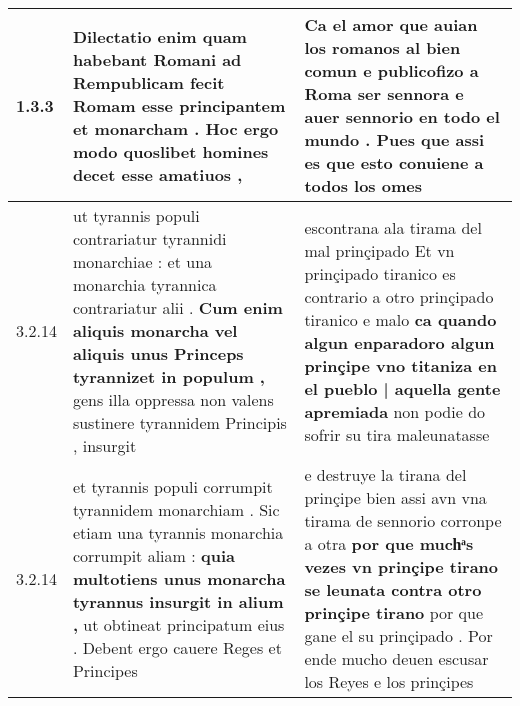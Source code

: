 \begin{tabular}{|p{1cm}|p{6.5cm}|p{6.5cm}|}

\hline
1.3.3 & Dilectatio enim quam habebant Romani ad Rempublicam fecit Romam esse principantem \textbf{ et monarcham . } Hoc ergo modo quoslibet homines decet esse amatiuos , & Ca el amor que auian los romanos al bien comun e publicofizo a Roma ser sennora \textbf{ e auer sennorio en todo el mundo . } Pues que assi es que esto conuiene a todos los omes \\\hline
3.2.14 & ut tyrannis populi contrariatur tyrannidi monarchiae : et una monarchia tyrannica contrariatur alii . \textbf{ Cum enim aliquis monarcha vel aliquis unus Princeps tyrannizet in populum , } gens illa oppressa non valens sustinere tyrannidem Principis , insurgit & escontrana ala tirama del mal prinçipado Et vn prinçipado tiranico es contrario a otro prinçipado tiranico e malo \textbf{ ca quando algun enparadoro algun prinçipe vno titaniza en el pueblo | aquella gente apremiada } non podie do sofrir su tira maleunatasse \\\hline
3.2.14 & et tyrannis populi corrumpit tyrannidem monarchiam . Sic etiam una tyrannis monarchia corrumpit aliam : \textbf{ quia multotiens unus monarcha tyrannus insurgit in alium , } ut obtineat principatum eius . Debent ergo cauere Reges et Principes & e destruye la tirana del prinçipe bien assi avn vna tirama de sennorio corronpe a otra \textbf{ por que muchͣs vezes vn prinçipe tirano se leunata contra otro prinçipe tirano } por que gane el su prinçipado . Por ende mucho deuen escusar los Reyes e los prinçipes \\\hline

\end{tabular}
